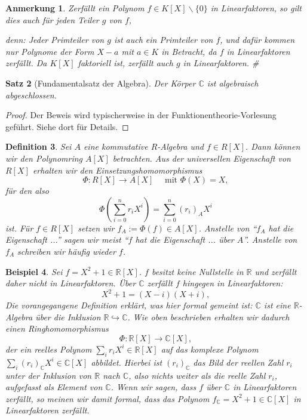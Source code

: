 \documentclass[a4paper, twoside, 11pt, ngerman]{report}
\newcommand{\CC}{\mathds C}
\newcommand{\RR}{\mathds R}
\renewcommand{\setminus}{\smallsetminus}
\theoremstyle{definistyle}
\newtheorem{satz}{Satz}[section]
\newtheorem{defini}[satz]{Definition}
\newtheorem{anm}[satz]{Anmerkung}
\newtheorem{bsp}[satz]{Beispiel}
\theoremstyle{remark}
\newenvironment{denn}%
  {\par\textit{denn:}}%
  {\hfill\#\par}
\begin{document}
\begin{anm}\label{anm:linfakt_teiler}
Zerfällt ein Polynom $f\in K[X]\setminus\{0\}$ in Linearfaktoren, so gilt dies auch für jeden Teiler $g$ von $f$, 
\begin{denn}
Jeder Primteiler von $g$ ist auch ein Primteiler von $f$, und dafür kommen
nur Polynome der Form $X-a$ mit $a\in K$ in Betracht, da $f$ in Linearfaktoren zerfällt.
Da $K[X]$ faktoriell ist, zerfällt auch $g$ in Linearfaktoren.
\end{denn}
\end{anm}

\begin{satz}[Fundamentalsatz der Algebra]\label{satz:fundamentalsatz_algebra}
Der Körper $\CC$ ist algebraisch abgeschlossen.
\end{satz}

\begin{proof}
Der Beweis wird typischerweise in der Funktionentheorie-Vorlesung geführt. Siehe dort für Details.
\end{proof}

\begin{defini}\label{def:nullstelle_in_A}
Sei $A$ eine kommutative $R$-Algebra und $f \in R[X]$. Dann können wir den Polynomring $A[X]$ betrachten. Aus der universellen Eigenschaft von $R[X]$ erhalten wir den Einsetzungshomomorphismus
\[
\Phi \colon R[X] \to A[X] \quad \text{ mit }\Phi(X) = X,
\]
für den also \[\Phi\left(\sum_{i=0}^n r_i X^i\right) = \sum_{i=0}^n (r_i)_A X^i\] ist.
Für $f\in R[X]$ setzen wir $f_A:=\Phi(f)\in A[X]$.
Anstelle von "`$f_A$ hat die Eigenschaft ..."' sagen wir meist "`$f$ hat die Eigenschaft ...
über $A$"'. Anstelle von $f_A$ schreiben wir häufig wieder $f$.
\end{defini}

\begin{bsp}\label{bsp:polynom_zerfall}
Sei $f = X^2 + 1 \in \RR[X]$. $f$ besitzt keine Nullstelle in $\RR$ und zerfällt daher nicht in Linearfaktoren. Über $\CC$ zerfällt $f$ hingegen in Linearfaktoren:
    \[
    X^2 + 1 = (X - i)(X + i),
    \]
Die vorangegangene Definition erklärt, was hier formal gemeint ist: $\CC$ ist eine $\RR$-Algebra über die Inklusion $\RR\hookrightarrow\CC$. Wie oben beschrieben erhalten wir dadurch
einen Ringhomomorphismus
\[
\Phi\colon\RR[X]\to\CC[X], 
\]
der ein reelles Polynom $\sum_i r_iX^i\in\RR[X]$ auf das komplexe Polynom $\sum_i (r_i)_\CC X^i\in\CC[X]$ abbildet. Hierbei ist $(r_i)_\CC$ das Bild der reellen Zahl $r_i$ unter der Inklusion von $\RR$ nach $\CC$, also nichts weiter als die reelle Zahl $r_i$, aufgefasst als Element von $\CC$. Wenn wir sagen, dass $f$ über $\CC$ in Linearfaktoren zerfällt, so meinen wir damit formal, dass das Polynom $f_\CC=X^2+1\in\CC[X]$ in Linearfaktoren zerfällt.
\end{bsp}
\end{document}
